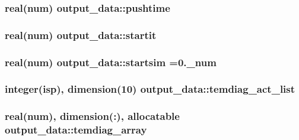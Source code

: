 \subsubsection[{\texorpdfstring{pushtime}{pushtime}}]{\setlength{\rightskip}{0pt plus 5cm}real(num) output\+\_\+data\+::pushtime}\hypertarget{namespaceoutput__data_a1616b369a6e32a80c9448bff6371d1cf}{}\label{namespaceoutput__data_a1616b369a6e32a80c9448bff6371d1cf}
\subsubsection[{\texorpdfstring{startit}{startit}}]{\setlength{\rightskip}{0pt plus 5cm}real(num) output\+\_\+data\+::startit}\hypertarget{namespaceoutput__data_a41d55c93b7330583e6a58d151f8d187b}{}\label{namespaceoutput__data_a41d55c93b7330583e6a58d151f8d187b}
\subsubsection[{\texorpdfstring{startsim}{startsim}}]{\setlength{\rightskip}{0pt plus 5cm}real(num) output\+\_\+data\+::startsim =0.\+\_\+num}\hypertarget{namespaceoutput__data_a3eebf5510f6656fe8385302d2aba28d5}{}\label{namespaceoutput__data_a3eebf5510f6656fe8385302d2aba28d5}
\subsubsection[{\texorpdfstring{temdiag\+\_\+act\+\_\+list}{temdiag_act_list}}]{\setlength{\rightskip}{0pt plus 5cm}integer(isp), dimension(10) output\+\_\+data\+::temdiag\+\_\+act\+\_\+list}\hypertarget{namespaceoutput__data_a63d2f446c4aca8bf956973b6ff9bcfb0}{}\label{namespaceoutput__data_a63d2f446c4aca8bf956973b6ff9bcfb0}
\subsubsection[{\texorpdfstring{temdiag\+\_\+array}{temdiag_array}}]{\setlength{\rightskip}{0pt plus 5cm}real(num), dimension(\+:), allocatable output\+\_\+data\+::temdiag\+\_\+array}\hypertarget{namespaceoutput__data_a034b19d2c3a5211b1fd96df24cd28dd1}{}\label{namespaceoutput__data_a034b19d2c3a5211b1fd96df24cd28dd1}
